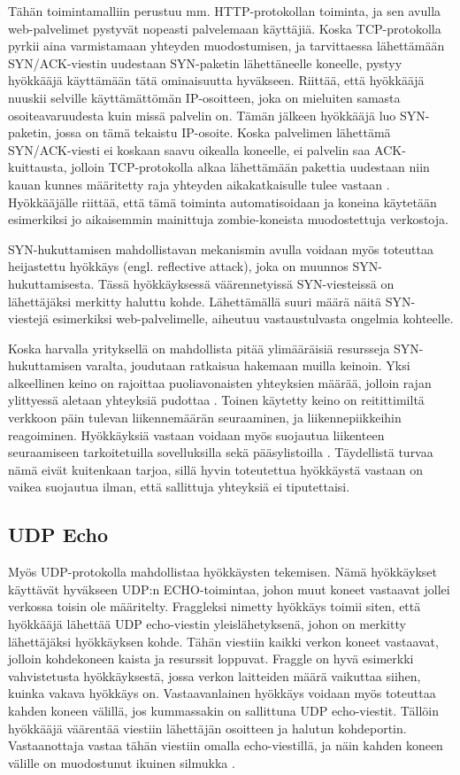 Tähän toimintamalliin perustuu mm. HTTP-protokollan toiminta, ja sen
avulla web-palvelimet pystyvät nopeasti palvelemaan käyttäjiä. Koska
TCP-protokolla pyrkii aina varmistamaan yhteyden muodostumisen, ja
tarvittaessa lähettämään SYN/ACK-viestin uudestaan SYN-paketin
lähettäneelle koneelle, pystyy hyökkääjä käyttämään tätä ominaisuutta
hyväkseen. Riittää, että hyökkääjä nuuskii selville käyttämättömän
IP-osoitteen, joka on mieluiten samasta osoiteavaruudesta kuin missä
palvelin on. Tämän jälkeen hyökkääjä luo SYN-paketin, jossa on tämä
tekaistu IP-osoite. Koska palvelimen lähettämä SYN/ACK-viesti ei
koskaan saavu oikealla koneelle, ei palvelin saa ACK-kuittausta,
jolloin TCP-protokolla alkaa lähettämään pakettia uudestaan niin kauan
kunnes määritetty raja yhteyden aikakatkaisulle tulee vastaan
\cite{hackthestack}. Hyökkääjälle riittää, että tämä toiminta automatisoidaan ja
koneina käytetään esimerkiksi jo aikaisemmin mainittuja
zombie-koneista muodostettuja verkostoja.

SYN-hukuttamisen mahdollistavan mekanismin avulla voidaan myös
toteuttaa heijastettu hyökkäys (engl. reflective attack), joka on
muunnos SYN-hukuttamisesta. Tässä hyökkäyksessä väärennetyissä
SYN-viesteissä on lähettäjäksi merkitty haluttu kohde. Lähettämällä
suuri määrä näitä SYN-viestejä esimerkiksi web-palvelimelle, aiheutuu
vastaustulvasta ongelmia kohteelle\cite{hackthestack}.

Koska harvalla yrityksellä on mahdollista pitää ylimääräisiä
resursseja SYN-hu\-kut\-ta\-mi\-sen varalta, joudutaan ratkaisua hakemaan
muilla keinoin. Yksi alkeellinen keino on rajoittaa puoliavonaisten
yhteyksien määrää, jolloin rajan ylittyessä aletaan yhteyksiä pudottaa
\cite{tcpip}. Toinen käytetty keino on reitittimiltä verkkoon päin tulevan
liikennemäärän seuraaminen, ja liikennepiikkeihin
reagoiminen. Hyökkäyksiä vastaan voidaan myös suojautua liikenteen
seuraamiseen tarkoitetuilla sovelluksilla sekä pääsylistoilla
\cite{hackthestack}. Täydellistä turvaa nämä eivät kuitenkaan tarjoa,
sillä hyvin
toteutettua hyökkäystä vastaan on vaikea suojautua ilman, että
sallittuja yhteyksiä ei tiputettaisi.

\subsection{UDP Echo}

Myös UDP-protokolla mahdollistaa hyökkäysten tekemisen. Nämä
hyökkäykset käyttävät hyväkseen UDP:n ECHO-toimintaa, johon muut
koneet vastaavat jollei verkossa toisin ole määritelty. Fraggleksi
nimetty hyökkäys toimii siten, että hyökkääjä lähettää UDP
echo-viestin yleislähetyksenä, johon on merkitty lähettäjäksi
hyökkäyksen kohde. Tähän viestiin kaikki verkon koneet vastaavat,
jolloin kohdekoneen kaista ja resurssit loppuvat. Fraggle on hyvä
esimerkki vahvistetusta hyökkäyksestä, jossa verkon laitteiden määrä
vaikuttaa siihen, kuinka vakava hyökkäys on\cite{websecurity}. Vastaavanlainen
hyökkäys voidaan myös toteuttaa kahden koneen välillä, jos kummassakin
on sallittuna UDP echo-viestit. Tällöin hyökkääjä väärentää viestiin
lähettäjän osoitteen ja halutun kohdeportin. Vastaanottaja vastaa
tähän viestiin omalla echo-viestillä, ja näin kahden koneen välille on
muodostunut ikuinen silmukka \cite{tcpip}.

